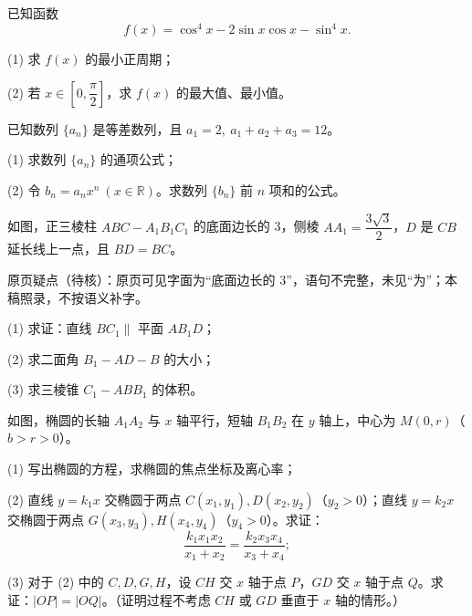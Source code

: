 \begin{question}
已知函数
\nopagebreak[4]
\[
    f(x)=\cos^4x-2\sin x\cos x-\sin^4x.
\]

    (1) 求 \(f(x)\) 的最小正周期；

    (2) 若 \(x\in\left[0,\dfrac{\pi}{2}\right]\)，求 \(f(x)\) 的最大值、最小值。

\end{question}
\begin{question}
已知数列 \(\{a_n\}\) 是等差数列，且 \(a_1=2,\ a_1+a_2+a_3=12\)。

    (1) 求数列 \(\{a_n\}\) 的通项公式；

    (2) 令 \(b_n=a_nx^n\ (x\in\mathbb R)\)。求数列 \(\{b_n\}\) 前 \(n\) 项和的公式。

\Needspace{0.4\textheight}
\end{question}
\begin{question}
如图，正三棱柱 \(ABC-A_1B_1C_1\) 的底面边长的 3，侧棱 \(AA_1=\dfrac{3\sqrt3}{2}\)，\(D\) 是 \(CB\) 延长线上一点，且 \(BD=BC\)。

\begin{gktip}
原页疑点（待核）：原页可见字面为“底面边长的 3”，语句不完整，未见“为”；本稿照录，不按语义补字。
\end{gktip}

    (1) 求证：直线 \(BC_1\parallel\) 平面 \(AB_1D\)；

    (2) 求二面角 \(B_1-AD-B\) 的大小；

    (3) 求三棱锥 \(C_1-ABB_1\) 的体积。
\nopagebreak[4]
\begin{center}\end{center}
\nopagebreak[4]
\Needspace{0.4\textheight}
\end{question}
\begin{question}
如图，椭圆的长轴 \(A_1A_2\) 与 \(x\) 轴平行，短轴 \(B_1B_2\) 在 \(y\) 轴上，中心为 \(M(0,r)\)（\(b>r>0\)）。

    (1) 写出椭圆的方程，求椭圆的焦点坐标及离心率；

    (2) 直线 \(y=k_1x\) 交椭圆于两点 \(C(x_1,y_1),D(x_2,y_2)\)（\(y_2>0\)）；直线 \(y=k_2x\) 交椭圆于两点 \(G(x_3,y_3),H(x_4,y_4)\)（\(y_4>0\)）。求证：
\nopagebreak[4]
\[
    \frac{k_1x_1x_2}{x_1+x_2}=\frac{k_2x_3x_4}{x_3+x_4};
\]

    (3) 对于 (2) 中的 \(C,D,G,H\)，设 \(CH\) 交 \(x\) 轴于点 \(P\)，\(GD\) 交 \(x\) 轴于点 \(Q\)。求证：\(|OP|=|OQ|\)。（证明过程不考虑 \(CH\) 或 \(GD\) 垂直于 \(x\) 轴的情形。）
\nopagebreak[4]
\begin{center}\end{center}
\nopagebreak[4]
\Needspace{0.4\textheight}
\end{question}
